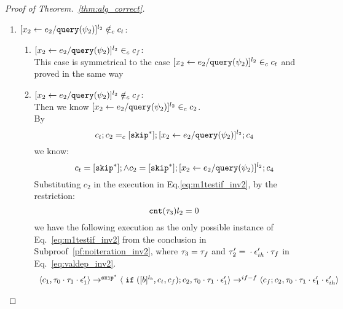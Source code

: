 \begin{proof}[Proof of Theorem.~\ref{thm:alg_correct}]
\begin{case}
\begin{subcase}
\begin{subsubcase}
\begin{subsubsubcase}
\begin{subproof}
\begin{enumerate}
\\
%
By $\flowsto$ definition, we have:
\[
  \forall z_i^{r_i} \in \lvar_{c_t},  x_j^{l_j} \in \lvar_c \st x_j \in VAR(b) \land l_j = \llabel(\trace_{ih}) x_j \implies
  \flowsto(x_j^{l_j}, z_i^{r_i}, c)
\]
i.e.,
\[
  \bigwedge_{\{ x_j^{l_j} \in \lvar_c \vert x_j \in VAR(b) \land x_j^{l_j} \in \live^{l_b}(c)\}}
  \flowsto(x_j^{l_j}, x_2^{l_2}, c)
\]
%
Based on Eq.~\ref{eq:valdep_ihtestb}, we know:
%
\[
  \bigvee_{\{y_i^{r_i} \vert y_i \in VAR(b) \land r_i = \llabel(\trace_{ih}) y_i\}}
  \exists z_1^{j_1} \cdots z_m^{j_m}, m \in \mathbb{N} \st 
  \flowsto(x_1^{l_1}, z_1^{j_1}) \land \cdots \land  \flowsto(z_m^{j_m}, y_i^{r_i})
  \land \flowsto(y_i^{r_i}, x_2^{l_2}, c) 
\]
%
i.e.,
\[
\Big(\exists z_1^{r_1}, \cdots, z_n^{r_n} \in \lvar_{{c}} \st 0 \leq n 
 \land \flowsto(x_1^{l_1}, z_1^{r_1}, c) \land \cdots \land \flowsto(z_n^{r_n}, {x}_2^{l_2}, c) \Big)
\]
%
This case is proved.
\item $[\mathrel{ {x}_2 \leftarrow e_2 / {\tt query}(\psi_2) }]^{l_2} \notin_c c_t$:
\begin{enumerate}
 \item $[\mathrel{ {x}_2 \leftarrow e_2 / {\tt query}(\psi_2) }]^{l_2} \in_c c_f$:
 \\
 This case is symmetrical to the case $[\mathrel{ {x}_2 \leftarrow e_2 / {\tt query}(\psi_2) }]^{l_2} \in_c c_t$ and proved in the same way
 \item $[\mathrel{ {x}_2 \leftarrow e_2 / {\tt query}(\psi_2) }]^{l_2} \notin_c c_f$:
 \\
 Then we know $[\mathrel{ {x}_2 \leftarrow e_2 / {\tt query}(\psi_2) }]^{l_2} \in_c c_2$.
 \\
 By
 \[
  c_t;c_2 =_c [\mathtt{skip}^*]; [\mathrel{ {x}_2 \leftarrow e_2 / {\tt query}(\psi_2) }]^{l_2};{c}_4
\]
we know:
\[
  c_t = [\mathtt{skip}^*]; \land c_2 = [\mathtt{skip}^*]; [\mathrel{ {x}_2 \leftarrow e_2 / {\tt query}(\psi_2) }]^{l_2};{c}_4
\]
Substituting $c_2$ in the execution in Eq.\ref{eq:m1testif_inv2}, by the restriction:
\[
  \mathtt{cnt}(\mathtt{\tau}_3)l_2 = 0
\]
we have the following execution as the only possible instance of Eq.~\ref{eq:m1testif_inv2} from the conclusion in Subproof~\ref{pf:noiteration_inv2}, where $\mathtt{\tau}_3 = \mathtt{\tau}_f$ 
and $\mathtt{\tau}_2' = {} \cdot {} \mathtt{\epsilon}_{ih}' \cdot \mathtt{\tau}_f$ in Eq.~\ref{eq:valdep_inv2}.
\[
    \begin{array}{l}   
  \langle c_1, \mathtt{\tau}_0 \cdot \mathtt{\tau}_1 \cdot \mathtt{\epsilon}_1' \rangle 
  \rightarrow^{\mathtt{skip}^*} 
  \langle \;\mathtt{if}\; ([b]^{l_b}, c_t, c_f); {c}_2, \mathtt{\tau}_0 \cdot \mathtt{\tau}_1 \cdot \mathtt{\epsilon}_1' \rangle 
  \rightarrow^{if-f} 
  \langle c_f;c_2, \mathtt{\tau}_0 \cdot \mathtt{\tau}_1 \cdot \mathtt{\epsilon}_1' \cdot \mathtt{\epsilon}_{ih}' \rangle 

\end{array}\]
\end{enumerate}
\end{enumerate}
\end{subproof}
\end{subsubsubcase}
\end{subsubcase}
\end{subcase}
\end{case}
\end{proof}
